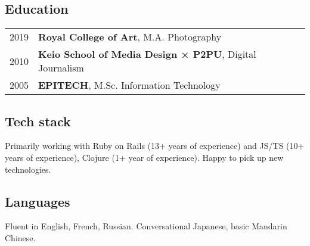 \documentclass[a4paper,11pt]{article}
\begin{document}
\subsection*{Education}

\begin{tabular}{ p{5em} p{30em} }
  2019 & \textbf{Royal College of Art}, M.A. Photography\\
  2010 & \textbf{Keio School of Media Design × P2PU}, Digital Journalism\\
  2005 & \textbf{EPITECH}, M.Sc. Information Technology\\
\end{tabular}

\subsection*{Tech stack}

Primarily working with Ruby on Rails (13+ years of experience) and JS/TS (10+ years of experience), Clojure (1+ year of experience). Happy to pick up new technologies.

\subsection*{Languages}

Fluent in English, French, Russian. Conversational Japanese, basic Mandarin Chinese.
\end{document}
